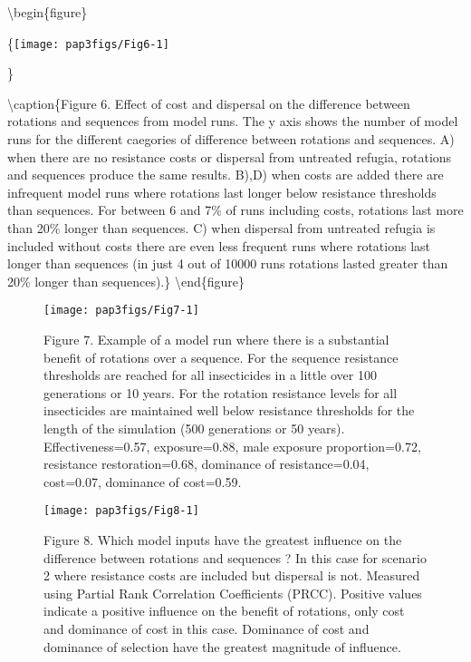 \documentclass[11pt,]{article}
\begin{document}
\pagebreak

\textbackslash{}begin\{figure\}

\{\centering \texttt{[image: pap3figs/Fig6-1]}

\}

\textbackslash{}caption\{Figure 6. Effect of cost and dispersal on the
difference between rotations and sequences from model runs. The y axis
shows the number of model runs for the different caegories of difference
between rotations and sequences. A) when there are no resistance costs
or dispersal from untreated refugia, rotations and sequences produce the
same results. B),D) when costs are added there are infrequent model runs
where rotations last longer below resistance thresholds than sequences.
For between 6 and 7\% of runs including costs, rotations last more than
20\% longer than sequences. C) when dispersal from untreated refugia is
included without costs there are even less frequent runs where rotations
last longer than sequences (in just 4 out of 10000 runs rotations lasted
greater than 20\% longer than sequences).\}\label{fig:Fig6}
\textbackslash{}end\{figure\}

\pagebreak

\begin{figure}

{\centering \texttt{[image: pap3figs/Fig7-1]} 

}

\caption{Figure 7. Example of a model run where there is a substantial benefit of rotations over a sequence. For the sequence resistance thresholds are reached for all insecticides in a little over 100 generations or 10 years. For the rotation resistance levels for all insecticides are maintained well below resistance thresholds for the length of the simulation (500 generations or 50 years). Effectiveness=0.57, exposure=0.88, male exposure proportion=0.72, resistance restoration=0.68, dominance of resistance=0.04, cost=0.07, dominance of cost=0.59.}\label{fig:Fig7}
\end{figure}

\pagebreak

\begin{figure}

{\centering \texttt{[image: pap3figs/Fig8-1]} 

}

\caption{Figure 8. Which model inputs have the greatest influence on the difference between rotations and sequences ? In this case for scenario 2 where resistance costs are included but dispersal is not. Measured using Partial Rank Correlation Coefficients (PRCC). Positive values indicate a positive influence on the benefit of rotations, only cost and dominance of cost in this case. Dominance of cost and dominance of selection have the greatest magnitude of influence.}\label{fig:Fig8}
\end{figure}
\end{document}
